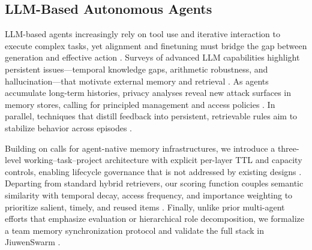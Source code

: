 \subsection{LLM-Based Autonomous Agents}
LLM-based agents increasingly rely on tool use and iterative interaction to execute complex tasks, yet alignment and finetuning must bridge the gap between generation and effective action \citep{wang2024learning}. Surveys of advanced LLM capabilities highlight persistent issues—temporal knowledge gaps, arithmetic robustness, and hallucination—that motivate external memory and retrieval \citep{roffo2024exploring}. As agents accumulate long-term histories, privacy analyses reveal new attack surfaces in memory stores, calling for principled management and access policies \citep{chen2026mrmmia}. In parallel, techniques that distill feedback into persistent, retrievable rules aim to stabilize behavior across episodes \citep{gallego2026distilling}.

Building on calls for agent-native memory infrastructures, we introduce a three-level working–task–project architecture with explicit per-layer TTL and capacity controls, enabling lifecycle governance that is not addressed by existing designs \citep{zhou2026we}. Departing from standard hybrid retrievers, our scoring function couples semantic similarity with temporal decay, access frequency, and importance weighting to prioritize salient, timely, and reused items \citep{sawarkar2024blended,ovcharov2026temporal}. Finally, unlike prior multi-agent efforts that emphasize evaluation or hierarchical role decomposition, we formalize a team memory synchronization protocol and validate the full stack in JiuwenSwarm \citep{rasheed2024large,rothfarb2025hierarchic}.
